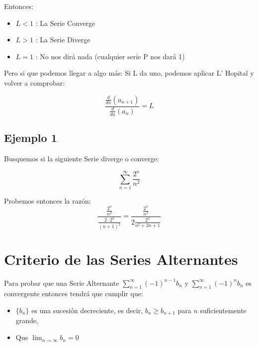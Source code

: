 \documentclass[12pt]{article}							    %
\begin{document}
Entonces:
\begin{itemize}
    \item $L < 1$ : La Serie Converge
    \item $L > 1$ : La Serie Diverge
    \item $L = 1$ : No nos dirá nada (cualquier serie P nos dará 1)
\end{itemize}

Pero si que podemos llegar a algo más:
Si L da uno, podemos aplicar L' Hopital y volver a comprobar:

\begin{equation}
\frac{\frac{d}{dn} (a_{n+1})}{\frac{d}{dn} (a_n)} = L
\end{equation}



\subsection{Ejemplo 1}
Busquemos si la siguiente Serie diverge o converge:

\begin{equation*}
    \sum_{n=1}^{\infty} \frac{2^n}{n^2}
\end{equation*}

Probemos entonces la razón:
\begin{equation*}
    \frac{ \frac{2^n}{n^2} }{ \frac{2 \cdot 2^n}{(n+1)^2 } } = \frac{ \frac{2^n}{n^2} }{ 2 \frac{2^n}{n^2 + 2n + 1} }
\end{equation*}



\clearpage
\section{Criterio de las Series Alternantes}

Para probar que una Serie Alternante $\sum_{n=1}^{\infty} (-1)^{n-1} b_n$ y $\sum_{n=1}^{\infty} (-1)^n b_n$ es convergente entonces tendrá que cumplir que:

\begin{itemize}
    \item $\{b_n\}$ es una sucesión decreciente, es decir, $b_n \geq b_{n+1}$ para $n$ suficientemente grande, 
    \item Que $\lim_{n \to \infty} b_n = 0$
\end{itemize}
\end{document}
